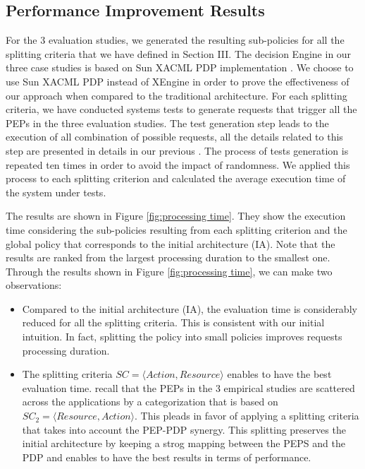 {\subsection{Performance Improvement Results}
For the 3 evaluation studies, we generated the resulting sub-policies for all the splitting criteria that we have defined in Section III.
The decision Engine in our three case studies is based on Sun XACML PDP implementation \cite{sunxacml}. We choose to use Sun XACML PDP instead of XEngine in order 
to prove the effectiveness of our approach when compared to the traditional architecture.
For each splitting criteria, we have conducted systems tests to generate requests that trigger all the PEPs in the three evaluation studies. 
The test generation step leads to the execution of all combination of possible requests, all the details related to this step are presented 
in details in our previous \cite{testcase}.  
The process of tests generation is repeated ten times in order to avoid the impact of randomness.
We applied this process to each splitting criterion and calculated the average execution time of the system under tests.


The results are shown in Figure \ref{fig:processing time}. They show the execution time considering the sub-policies resulting from each splitting criterion and the global policy 
that corresponds to the initial architecture (IA). Note that the results are ranked from the largest processing duration to the smallest one. 
Through the results shown in Figure \ref{fig:processing time}, we can make two observations:

\begin{itemize} 
\item Compared to the initial architecture (IA), the evaluation time is considerably reduced for all the splitting criteria. This is consistent with our 
initial intuition. In fact, splitting the policy into small policies improves requests processing duration.


\item The splitting criteria \normalsize $SC=\langle Action, Resource\rangle$ enables to have the best evaluation time. 
recall that the PEPs in the 3 empirical studies are scattered across the applications by a categorization 
that is based on $SC_{2}=\langle Resource,Action\rangle$. This pleads in favor of applying a splitting criteria 
that takes into account the PEP-PDP synergy. This splitting preserves the initial architecture by keeping a strog mapping between the PEPS and the PDP and enables 
to have the best results in terms of performance.


\end{itemize}}
